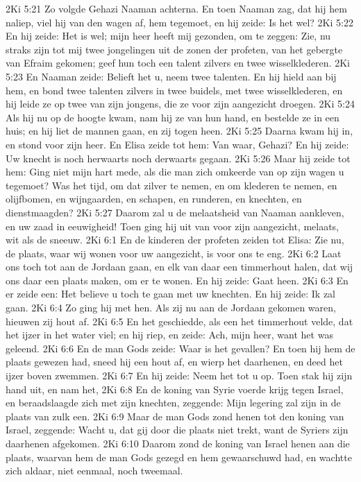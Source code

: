 2Ki 5:21  Zo volgde Gehazi Naaman achterna. En toen Naaman zag, dat hij hem naliep, viel hij van den wagen af, hem tegemoet, en hij zeide: Is het wel?
2Ki 5:22  En hij zeide: Het is wel; mijn heer heeft mij gezonden, om te zeggen: Zie, nu straks zijn tot mij twee jongelingen uit de zonen der profeten, van het gebergte van Efraim gekomen; geef hun toch een talent zilvers en twee wisselklederen.
2Ki 5:23  En Naaman zeide: Belieft het u, neem twee talenten. En hij hield aan bij hem, en bond twee talenten zilvers in twee buidels, met twee wisselklederen, en hij leide ze op twee van zijn jongens, die ze voor zijn aangezicht droegen.
2Ki 5:24  Als hij nu op de hoogte kwam, nam hij ze van hun hand, en bestelde ze in een huis; en hij liet de mannen gaan, en zij togen heen.
2Ki 5:25  Daarna kwam hij in, en stond voor zijn heer. En Elisa zeide tot hem: Van waar, Gehazi? En hij zeide: Uw knecht is noch herwaarts noch derwaarts gegaan.
2Ki 5:26  Maar hij zeide tot hem: Ging niet mijn hart mede, als die man zich omkeerde van op zijn wagen u tegemoet? Was het tijd, om dat zilver te nemen, en om klederen te nemen, en olijfbomen, en wijngaarden, en schapen, en runderen, en knechten, en dienstmaagden?
2Ki 5:27  Daarom zal u de melaatsheid van Naaman aankleven, en uw zaad in eeuwigheid! Toen ging hij uit van voor zijn aangezicht, melaats, wit als de sneeuw.
2Ki 6:1  En de kinderen der profeten zeiden tot Elisa: Zie nu, de plaats, waar wij wonen voor uw aangezicht, is voor ons te eng.
2Ki 6:2  Laat ons toch tot aan de Jordaan gaan, en elk van daar een timmerhout halen, dat wij ons daar een plaats maken, om er te wonen. En hij zeide: Gaat heen.
2Ki 6:3  En er zeide een: Het believe u toch te gaan met uw knechten. En hij zeide: Ik zal gaan.
2Ki 6:4  Zo ging hij met hen. Als zij nu aan de Jordaan gekomen waren, hieuwen zij hout af.
2Ki 6:5  En het geschiedde, als een het timmerhout velde, dat het ijzer in het water viel; en hij riep, en zeide: Ach, mijn heer, want het was geleend.
2Ki 6:6  En de man Gods zeide: Waar is het gevallen? En toen hij hem de plaats gewezen had, sneed hij een hout af, en wierp het daarhenen, en deed het ijzer boven zwemmen.
2Ki 6:7  En hij zeide: Neem het tot u op. Toen stak hij zijn hand uit, en nam het,
2Ki 6:8  En de koning van Syrie voerde krijg tegen Israel, en beraadslaagde zich met zijn knechten, zeggende: Mijn legering zal zijn in de plaats van zulk een.
2Ki 6:9  Maar de man Gods zond henen tot den koning van Israel, zeggende: Wacht u, dat gij door die plaats niet trekt, want de Syriers zijn daarhenen afgekomen.
2Ki 6:10  Daarom zond de koning van Israel henen aan die plaats, waarvan hem de man Gods gezegd en hem gewaarschuwd had, en wachtte zich aldaar, niet eenmaal, noch tweemaal.
